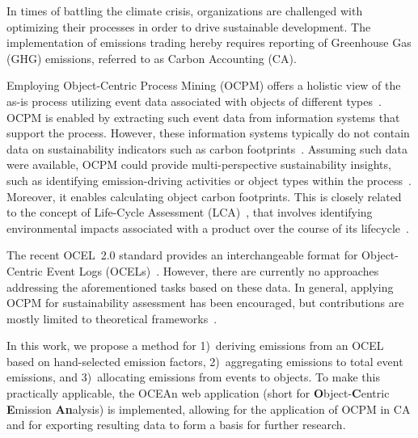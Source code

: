 

In times of battling the climate crisis,
organizations are challenged with optimizing their processes
in order to drive sustainable development.
The implementation of emissions trading hereby requires reporting of Greenhouse Gas (GHG) emissions, referred to as Carbon Accounting (CA).

Employing Object-Centric Process Mining (OCPM) offers a holistic view of the as-is process utilizing event data associated with objects of different types~\cite{vanderAalst19object}.
OCPM is enabled by extracting such event data from information systems that support the process.
However, these information systems typically do not contain data on sustainability indicators such as carbon footprints~\cite{Brehm22process}.
Assuming such data were available,
OCPM could provide multi-perspective sustainability insights,
such as identifying emission-driving activities or object types within the process~\cite{Brehm22process,Graves23rethink}.
Moreover, it enables calculating object carbon footprints. This is closely related to the concept of Life-Cycle Assessment (LCA)~\cite{Graves23rethink},
that involves identifying environmental impacts associated with a product over the course of its lifecycle~\cite{Ortmeier21framework}.

The recent OCEL~2.0 standard provides an interchangeable format for Object-Centric Event Logs (OCELs)~\cite{OCEL2}. However, there are currently no approaches addressing the aforementioned tasks based on these data.
In general, applying OCPM for sustainability assessment has been encouraged,
but contributions are mostly limited to theoretical frameworks~\cite{Graves23rethink,Ortmeier21framework}.

In this work,
we propose a method for
1)\ deriving emissions from an OCEL based on hand-selected emission factors,
2)\ aggregating emissions to total event emissions,
and 3)\ allocating emissions from events to objects.
To make this practically applicable, the OCEAn web application
(short for \textbf{O}bject-\textbf{C}entric \textbf{E}mission \textbf{An}alysis)
is implemented,
allowing for the application of OCPM in CA and for exporting resulting data to form a basis for further research.

